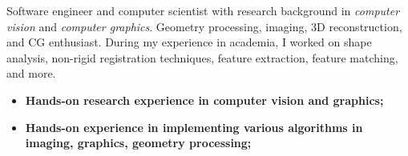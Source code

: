 


Software engineer and computer scientist with research background in 
\textit{computer vision} and \textit{computer graphics}. Geometry processing, imaging, 3D
reconstruction, and CG enthusiast. During my experience in academia, I worked
on shape analysis, non-rigid registration techniques, feature extraction, feature matching, and more.
\begin{itemize}
	\item \textbf{Hands-on research experience in computer vision and graphics;}
	\item \textbf{Hands-on experience in implementing various algorithms in imaging, graphics, geometry processing;}
\end{itemize}
